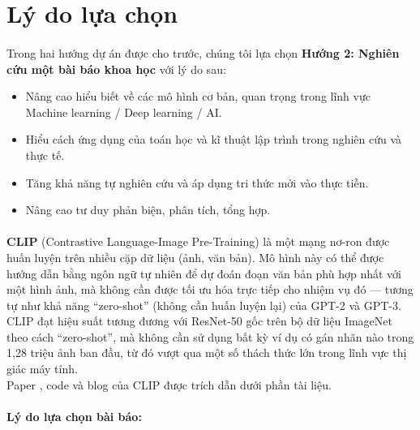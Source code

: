 \section{Lý do lựa chọn}

\paragraph{}{Trong hai hướng dự án được cho trước, chúng tôi lựa chọn \textbf{Hướng 2: Nghiên cứu một bài báo khoa học} với lý do sau:}

\begin{itemize}
    \item Nâng cao hiểu biết về các mô hình cơ bản, quan trọng trong lĩnh vực Machine learning / Deep learning / AI. 
    \item Hiểu cách ứng dụng của toán học và kĩ thuật lập trình trong nghiên cứu và thực tế.
    \item Tăng khả năng tự nghiên cứu và áp dụng tri thức mới vào thực tiễn.
    \item Nâng cao tư duy phản biện, phân tích, tổng hợp.
\end{itemize}

\paragraph{}{\textbf{CLIP} \cite{radford2021learning} (Contrastive Language-Image Pre-Training) là một mạng nơ-ron được huấn luyện trên nhiều cặp dữ liệu (ảnh, văn bản). Mô hình này có thể được hướng dẫn bằng ngôn ngữ tự nhiên để dự đoán đoạn văn bản phù hợp nhất với một hình ảnh, mà không cần được tối ưu hóa trực tiếp cho nhiệm vụ đó — tương tự như khả năng “zero-shot” (không cần huấn luyện lại) của GPT-2 và GPT-3.\\

CLIP đạt hiệu suất tương đương với ResNet-50 gốc trên bộ dữ liệu ImageNet theo cách “zero-shot”, mà không cần sử dụng bất kỳ ví dụ có gán nhãn nào trong 1,28 triệu ảnh ban đầu, từ đó vượt qua một số thách thức lớn trong lĩnh vực thị giác máy tính.\\

Paper \cite{radford2021learning}, code \cite{code_clip} và blog \cite{blog_clip} của CLIP được trích dẫn dưới phần tài liệu.
}

\paragraph{}{\textbf{Lý do lựa chọn bài báo:}}

